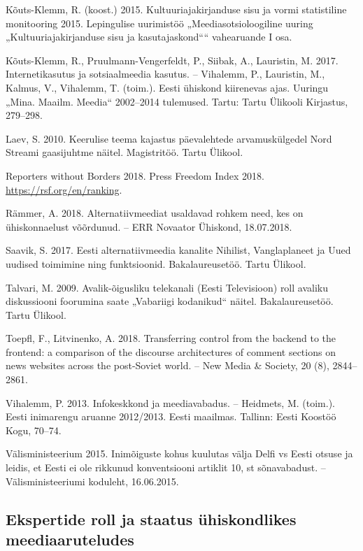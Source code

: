 \documentclass[estonian,]{article}
\begin{document}
Kõuts-Klemm, R. (koost.) 2015. Kultuuriajakirjanduse sisu ja vormi statistiline monitooring 2015. Lepingulise uurimistöö „Meediasotsioloogiline uuring „Kultuuriajakirjanduse sisu ja kasutajaskond```` vahearuande I osa.

Kõuts-Klemm, R., Pruulmann-Vengerfeldt, P., Siibak, A., Lauristin, M. 2017. Internetikasutus ja sotsiaalmeedia kasutus. -- Vihalemm, P., Lauristin, M., Kalmus, V., Vihalemm, T. (toim.). Eesti ühiskond kiirenevas ajas. Uuringu „Mina. Maailm. Meedia`` 2002--2014 tulemused. Tartu: Tartu Ülikooli Kirjastus, 279--298.

Laev, S. 2010. Keerulise teema kajastus päevalehtede arvamuskülgedel Nord Streami gaasijuhtme näitel. Magistritöö. Tartu Ülikool.

Reporters without Borders 2018. Press Freedom Index 2018. \url{https://rsf.org/en/ranking}.

Rämmer, A. 2018. Alternatiivmeediat usaldavad rohkem need, kes on ühiskonnaelust võõrdunud. -- ERR Novaator Ühiskond, 18.07.2018.

Saavik, S. 2017. Eesti alternatiivmeedia kanalite Nihilist, Vanglaplaneet ja Uued uudised toimimine ning funktsioonid. Bakalaureusetöö. Tartu Ülikool.

Talvari, M. 2009. Avalik-õigusliku telekanali (Eesti Televisioon) roll avaliku diskussiooni foorumina saate „Vabariigi kodanikud`` näitel. Bakalaureusetöö. Tartu Ülikool.

Toepfl, F., Litvinenko, A. 2018. Transferring control from the backend to the frontend: a comparison of the discourse architectures of comment sections on news websites across the post-Soviet world. -- New Media \& Society, 20 (8), 2844--2861.

Vihalemm, P. 2013. Infokeskkond ja meediavabadus. -- Heidmets, M. (toim.). Eesti inimarengu aruanne 2012/2013. Eesti maailmas. Tallinn: Eesti Koostöö Kogu, 70--74.

Välisministeerium 2015. Inimõiguste kohus kuulutas välja Delfi vs Eesti otsuse ja leidis, et Eesti ei ole rikkunud konventsiooni artiklit 10, st sõnavabadust. -- Välisministeeriumi koduleht, 16.06.2015.

\hypertarget{ekspertide-roll-ja-staatus-uxfchiskondlikes-meediaaruteludes}{%
\subsection{Ekspertide roll ja staatus ühiskondlikes meediaaruteludes}\label{ekspertide-roll-ja-staatus-uxfchiskondlikes-meediaaruteludes}}
\end{document}
